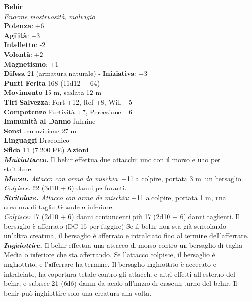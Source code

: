 \begin{multicols}{2}
\medskip\textbf{Behir}\\
\emph{Enorme mostruosità, malvagio}\\
\textbf{Potenza}: +6\\
\textbf{Agilità}: +3\\
\textbf{Intelletto}: -2\\
\textbf{Volontà}: +2\\
\textbf{Magnetismo}: +1\\
\textbf{Difesa} 21 (armatura naturale) - \textbf{Iniziativa}: +3\\
\textbf{Punti Ferita} 168 (16d12 + 64)\\
\textbf{Movimento} 15 m, scalata 12 m\\
\textbf{Tiri Salvezza}: Fort +12, Ref +8, Will +5\\
\textbf{Competenze} Furtività +7, Percezione +6\\
\textbf{Immunità al Danno} fulmine\\
\textbf{Sensi} scurovisione 27 m\\
\textbf{Linguaggi} Draconico\\
\textbf{Sfida} 11 (7.200 PE)\smallskip
\smallskip\textbf{Azioni}\\
\emph{\textbf{Multiattacco.}} Il behir effettua due attacchi: uno con il morso e uno per stritolare.\\
\emph{\textbf{Morso.} Attacco con arma da mischia}: +11 a colpire, portata 3 m, un bersaglio.\\
\emph{Colpisce:} 22 (3d10 + 6) danni perforanti.\\
\emph{\textbf{Stritolare.} Attacco con arma da mischia}: +11 a colpire, portata 1 m, una creatura di taglia Grande o inferiore.\\
\emph{Colpisce:} 17 (2d10 + 6) danni contundenti più 17 (2d10 + 6) danni taglienti. Il bersaglio è afferrato (DC 16 per fuggire) Se il behir non sta già stritolando un'altra creatura, il bersaglio è afferrato e intralciato fino al termine dell'afferrare.\\
\emph{\textbf{Inghiottire.}} Il behir effettua una attacco di morso contro un bersaglio di taglia Media o inferiore che sta afferrando. Se l'attacco colpisce, il bersaglio è inghiottito, e l'afferrare ha termine. Il bersaglio inghiottito è accecato e intralciato, ha copertura totale contro gli attacchi e altri effetti all'esterno del behir, e subisce 21 (6d6) danni da acido all'inizio di ciascun turno del behir. Il behir può inghiottire solo una creatura alla volta.\\

\end{multicols}
